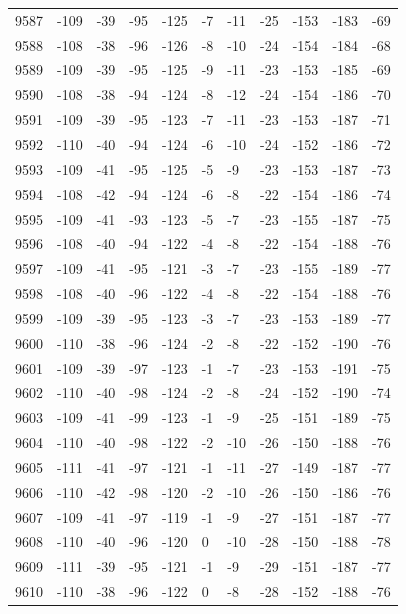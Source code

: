 \begin{table}[H]
\begin{tabular}{lllllllllll}
9587 & -109 & -39 & -95 & -125 & -7 & -11 & -25 & -153 & -183 & -69 \\
9588 & -108 & -38 & -96 & -126 & -8 & -10 & -24 & -154 & -184 & -68 \\
9589 & -109 & -39 & -95 & -125 & -9 & -11 & -23 & -153 & -185 & -69 \\
9590 & -108 & -38 & -94 & -124 & -8 & -12 & -24 & -154 & -186 & -70 \\
9591 & -109 & -39 & -95 & -123 & -7 & -11 & -23 & -153 & -187 & -71 \\
9592 & -110 & -40 & -94 & -124 & -6 & -10 & -24 & -152 & -186 & -72 \\
9593 & -109 & -41 & -95 & -125 & -5 & -9 & -23 & -153 & -187 & -73 \\
9594 & -108 & -42 & -94 & -124 & -6 & -8 & -22 & -154 & -186 & -74 \\
9595 & -109 & -41 & -93 & -123 & -5 & -7 & -23 & -155 & -187 & -75 \\
9596 & -108 & -40 & -94 & -122 & -4 & -8 & -22 & -154 & -188 & -76 \\
9597 & -109 & -41 & -95 & -121 & -3 & -7 & -23 & -155 & -189 & -77 \\
9598 & -108 & -40 & -96 & -122 & -4 & -8 & -22 & -154 & -188 & -76 \\
9599 & -109 & -39 & -95 & -123 & -3 & -7 & -23 & -153 & -189 & -77 \\
9600 & -110 & -38 & -96 & -124 & -2 & -8 & -22 & -152 & -190 & -76 \\
9601 & -109 & -39 & -97 & -123 & -1 & -7 & -23 & -153 & -191 & -75 \\
9602 & -110 & -40 & -98 & -124 & -2 & -8 & -24 & -152 & -190 & -74 \\
9603 & -109 & -41 & -99 & -123 & -1 & -9 & -25 & -151 & -189 & -75 \\
9604 & -110 & -40 & -98 & -122 & -2 & -10 & -26 & -150 & -188 & -76 \\
9605 & -111 & -41 & -97 & -121 & -1 & -11 & -27 & -149 & -187 & -77 \\
9606 & -110 & -42 & -98 & -120 & -2 & -10 & -26 & -150 & -186 & -76 \\
9607 & -109 & -41 & -97 & -119 & -1 & -9 & -27 & -151 & -187 & -77 \\
9608 & -110 & -40 & -96 & -120 & 0 & -10 & -28 & -150 & -188 & -78 \\
9609 & -111 & -39 & -95 & -121 & -1 & -9 & -29 & -151 & -187 & -77 \\
9610 & -110 & -38 & -96 & -122 & 0 & -8 & -28 & -152 & -188 & -76 \\

\end{tabular}
\end{table}
